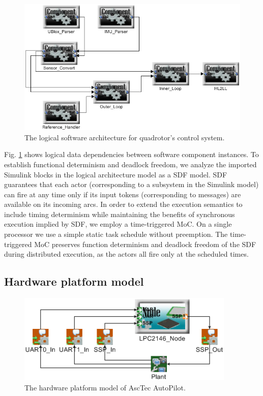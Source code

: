 \documentclass[10pt, conference, compsocconf]{IEEEtran}
\begin{document}
\begin{figure}[!t]
\centering
\includegraphics[width=\columnwidth]{figures/QuadrotorLogicalSoftwareArchitecture.png}
\caption{The logical software architecture for quadrotor's control system.}
\label{fig:QuadrotorLogicalSoftwareArchitecture}
\end{figure}

Fig. \ref{fig:QuadrotorLogicalSoftwareArchitecture} shows logical data dependencies between software component instances. To establish functional determinism and deadlock freedom, we analyze the imported Simulink blocks in the logical architecture model as a SDF model. SDF guarantees that each actor (corresponding to a subsystem in the Simulink model) can fire at any time only if its input tokens (corresponding to messages) are available on its incoming arcs. In order to extend the execution semantics to include timing determinism while maintaining the benefits of synchronous execution implied by SDF, we employ a time-triggered MoC. On a single processor we use a simple static task schedule without preemption. The time-triggered MoC preserves function determinism and deadlock freedom of the SDF during distributed execution, as the actors all fire only at the scheduled times.

\subsection{Hardware platform model}

\begin{figure}[!t]
\centering
\includegraphics[width=0.80\columnwidth]{figures/QuadrotorHardwarePlatform.png}
\caption{The hardware platform model of AscTec AutoPilot.}
\label{fig:QuadrotorHardwarePlatform}
\end{figure}
\end{document}
